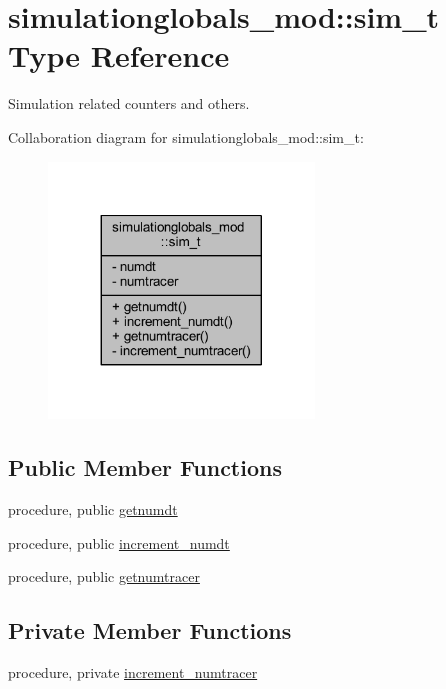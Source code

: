 \hypertarget{structsimulationglobals__mod_1_1sim__t}{}\section{simulationglobals\+\_\+mod\+:\+:sim\+\_\+t Type Reference}
\label{structsimulationglobals__mod_1_1sim__t}


Simulation related counters and others.  




Collaboration diagram for simulationglobals\+\_\+mod\+:\+:sim\+\_\+t\+:\nopagebreak
\begin{figure}[H]
\begin{center}
\leavevmode
\includegraphics[width=200pt]{structsimulationglobals__mod_1_1sim__t__coll__graph}
\end{center}
\end{figure}
\subsection*{Public Member Functions}
\begin{DoxyCompactItemize}
\item 
procedure, public \mbox{\hyperlink{structsimulationglobals__mod_1_1sim__t_a4f67d96ae861d1600d365cc86acbc1a7}{getnumdt}}
\item 
procedure, public \mbox{\hyperlink{structsimulationglobals__mod_1_1sim__t_ade3d2bcc84ed41592b0712a0355be108}{increment\+\_\+numdt}}
\item 
procedure, public \mbox{\hyperlink{structsimulationglobals__mod_1_1sim__t_af581a3f3854589b767c95bf4b3d3a388}{getnumtracer}}
\end{DoxyCompactItemize}
\subsection*{Private Member Functions}
\begin{DoxyCompactItemize}
\item 
procedure, private \mbox{\hyperlink{structsimulationglobals__mod_1_1sim__t_afef25e0feaad4ec1cff7afd93bc53812}{increment\+\_\+numtracer}}
\end{DoxyCompactItemize}
